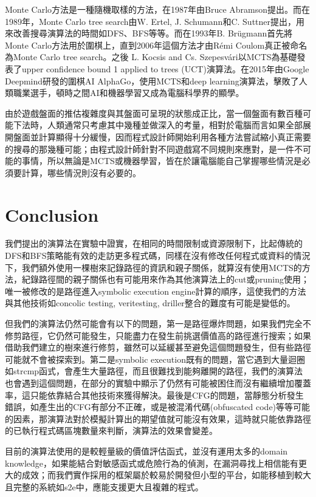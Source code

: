 \documentclass[12pt,a4paper,oneside]{book}
\begin{document}
Monte Carlo方法是一種隨機取樣的方法，在1987年由Bruce Abramson提出\cite{mcmethod}。而在1989年，Monte Carlo tree search由W. Ertel, J. Schumann和C. Suttner提出，用來改善搜尋演算法的時間如DFS、BFS等等。而在1993年B. Brügmann首先將Monte Carlo方法用於圍棋上\cite{mc_go}，直到2006年這個方法才由Rémi Coulom真正被命名為Monte Carlo tree search\cite{MCTS_naming}。之後 L. Kocsis and Cs. Szepesvári以MCTS為基礎發表了upper confidence bound 1 applied to trees (UCT)演算法\cite {UCT}。在2015年由Google Deepmind研發的圍棋AI AlphaGo\cite{alphago}，使用MCTS和deep learning演算法，擊敗了人類職業選手，頓時之間AI和機器學習又成為電腦科學界的顯學。

由於遊戲盤面的推估複雜度與其盤面可呈現的狀態成正比，當一個盤面有數百種可能下法時，人類通常只考慮其中幾種並做深入的考量，相對於電腦而言如果全部展開盤面並計算顯得十分緩慢，因而程式設計師開始利用各種方法嘗試縮小真正需要的搜尋的那幾種可能；由程式設計師針對不同遊戲寫不同規則來應對，是一件不可能的事情，所以無論是MCTS或機器學習，皆在於讓電腦能自己掌握哪些情況是必須要計算，哪些情況則沒有必要的。

\chapter{Conclusion}

我們提出的演算法在實驗中證實，在相同的時間限制或資源限制下，比起傳統的DFS和BFS策略能有效的走訪更多程式碼，同樣在沒有修改任何程式或資料的情況下，我們額外使用一棵樹來記錄路徑的資訊和親子關係，就算沒有使用MCTS的方法，紀錄路徑間的親子關係也有可能用來作為其他演算法上的cut或pruning使用；唯一被修改的是路徑進入symbolic execution engine計算的順序，這使我們的方法與其他技術如concolic testing\cite{sen2007concolic}, veritesting\cite{Veritesting}, driller\cite{stephens2016driller}整合的難度有可能是變低的。

但我們的演算法仍然可能會有以下的問題，第一是路徑爆炸問題，如果我們完全不修剪路徑，它仍然可能發生，只能盡力在發生前挑選價值高的路徑進行搜索；如果借助我們建立的樹來進行修剪，雖然可以延緩甚至避免這個問題發生，但有些路徑可能就不會被探索到。第二是symbolic execution既有的問題，當它遇到大量迴圈如strcmp函式，會產生大量路徑，而且很難找到能夠離開的路徑，我們的演算法也會遇到這個問題，在部分的實驗中顯示了仍然有可能被困住而沒有繼續增加覆蓋率，這只能依靠結合其他技術來獲得解決。最後是CFG的問題，當靜態分析發生錯誤，如產生出的CFG有部分不正確，或是被混淆代碼(obfuscated code)等等可能的因素，那演算法對於模擬計算出的期望值就可能沒有效果，這時就只能依靠路徑的已執行程式碼區塊數量來判斷，演算法的效果會變差。

目前的演算法使用的是較輕量級的價值評估函式，並沒有運用太多的domain knowledge，如果能結合對敏感函式或危險行為的偵測，在漏洞尋找上相信能有更大的成效；而我們實作採用的框架屬於較易於開發但小型的平台，如能移植到較大且完整的系統如s2e中，應能支援更大且複雜的程式。

\newpage

\printbibliography[title={References}]
\end{document}
